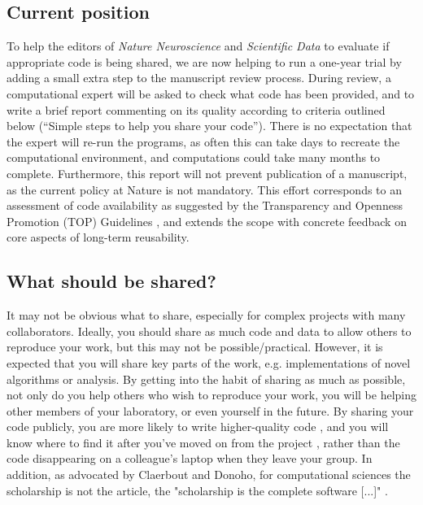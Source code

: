 \documentclass[11pt]{article}
\begin{document}
\subsection*{Current position}

To help the editors of \textit{Nature Neuroscience} and
\textit{Scientific Data} to evaluate if appropriate code is being
shared, we are now helping to run a one-year trial by adding a small
extra step to the manuscript review process.  During review, a
computational expert will be asked to check what code has been
provided, and to write a brief report commenting on its quality
according to criteria outlined below (``Simple steps to help you share
your code'').  There is no expectation that the expert will re-run the
programs, as often this can take days to recreate the computational
environment, and computations could take many months to complete.
Furthermore, this report will not prevent publication of a manuscript, as the current policy at Nature is not mandatory.
This effort corresponds to an assessment of code availability as suggested by
the Transparency and Openness Promotion (TOP) Guidelines \cite{Nosek2015}, and
extends the scope with concrete feedback on core aspects of long-term reusability.

\subsection*{What should be shared?}

It may not be obvious what to share, especially for complex projects with many
collaborators.  Ideally, you should share as much code and data to allow others to
reproduce your work,  but this may not be possible/practical.  However, it
is expected that you will share key parts of the work, e.g. implementations of
novel algorithms or analysis.  By getting into the habit of sharing as much as
possible, not only do you help others who wish to reproduce your work, you will be
helping other members of your laboratory, or even yourself in the future.  By
sharing your code publicly, you are more likely to write higher-quality code
\cite{Easterbrook2014}, and you will know where to find it after you've moved on
from the project \cite{Halchenko2015}, rather than the code disappearing on a
colleague's laptop when they leave your group. In addition, as advocated by
Claerbout and Donoho, for computational sciences the scholarship is not the article, the "scholarship is the complete software [...]" \cite{claerbout_electronic_1992,donoho_invitation_2010}.
\end{document}

